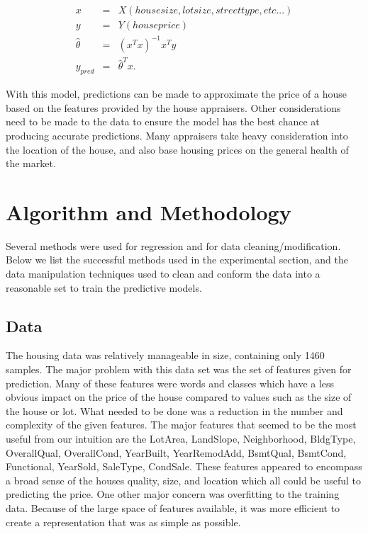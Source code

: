 \documentclass[fleqn,10pt]{SelfArx} %
\begin{document}
\begin{eqnarray}
	x &=& X(housesize,lotsize,streettype,etc...)\\
	y &=& Y(houseprice)\\
	\hat{\theta} &=& (x^Tx)^{-1}x^Ty \\
	y_{pred} &=& \hat{\theta}^Tx.
\end{eqnarray}

With this model, predictions can be made to approximate the price of a house based on the features provided by the house appraisers. Other considerations need to be made
to the data to ensure the model has the best chance at producing accurate predictions. Many appraisers take heavy consideration into the location of the house, and also 
base housing prices on the general health of the market.




\section{Algorithm and Methodology}


Several methods were used for regression and for data cleaning/modification. Below we list the successful methods used in the experimental section, and the data manipulation
techniques used to clean and conform the data into a reasonable set to train the predictive models.


\subsection{Data}

The housing data was relatively manageable in size, containing only 1460 samples. The major problem with this data set was the set of features given for prediction. Many of these features were words and classes which have a less obvious impact on the price of the house compared to values such as the size of the house or lot.  What needed to be done was a reduction in the number and complexity of the given features. The major features that seemed to be the most useful from our intuition are the LotArea, LandSlope, Neighborhood, BldgType, OverallQual, OverallCond, YearBuilt, YearRemodAdd, BsmtQual, BsmtCond, Functional, YearSold, SaleType, CondSale. These features appeared to encompass a broad sense of the houses quality, size, and location which all could be useful to predicting the price. One other major concern was overfitting to the training data. Because of the large space of features available, it was more efficient to create a representation that was as simple as possible.
\end{document}
